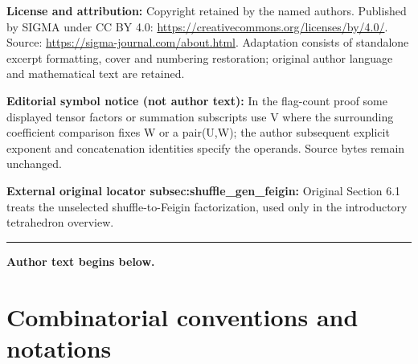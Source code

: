 \documentclass[11pt]{article}
\numberwithin{equation}{section}
\begin{document}
\noindent\textbf{License and attribution:} Copyright retained by the named authors. Published by SIGMA under CC BY 4.0: \url{https://creativecommons.org/licenses/by/4.0/}. Source: \url{https://sigma-journal.com/about.html}. Adaptation consists of standalone excerpt formatting, cover and numbering restoration; original author language and mathematical text are retained.\par
\noindent\textbf{Editorial symbol notice (not author text):} In the flag-count proof some displayed tensor factors or summation subscripts use V where the surrounding coefficient comparison fixes W or a pair(U,W); the author subsequent explicit exponent and concatenation identities specify the operands. Source bytes remain unchanged.\par
\noindent\textbf{External original locator subsec:shuffle\_gen\_feigin:} Original Section 6.1 treats the unselected shuffle-to-Feigin factorization, used only in the introductory tetrahedron overview.\par
\medskip\hrule\medskip\noindent\textbf{Author text begins below.}\par
\setcounter{section}{1}
\setcounter{subsection}{0}
\setcounter{subsubsection}{0}
\setcounter{Theorem}{0}
\setcounter{equation}{0}
\section{Combinatorial conventions and notations}\label{sec:combinatorics}
\end{document}
